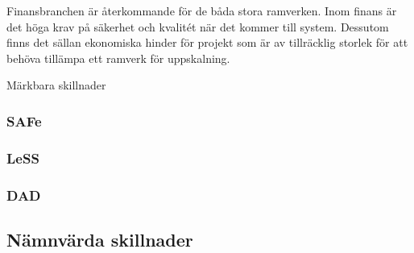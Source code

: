 	
	
	Finansbranchen är återkommande för de båda stora ramverken. Inom finans är det höga krav på säkerhet och kvalitét när det kommer till system. Dessutom finns det sällan ekonomiska hinder för projekt som är av tillräcklig storlek för att behöva tillämpa ett ramverk för uppskalning. 
	
	Märkbara skillnader 
	
	
	\subsubsection{SAFe}
		
	
	\subsubsection{LeSS}
	
	\subsubsection{DAD}
	
	\subsection{Nämnvärda skillnader}